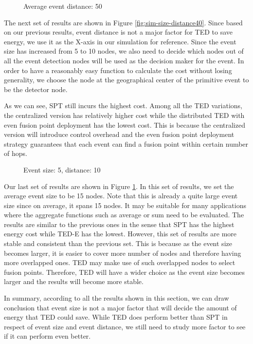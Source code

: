 \begin{figure}
\centering
{}
\caption{Average event distance: 50}
\label{fig:sim-size-distance50}
\end{figure}

The next set of results are shown in Figure \ref{fig:sim-size-distance40}. Since based on our previous results, event distance is not a major factor for TED to save energy, we use it as the X-axis in our simulation for reference. Since the event size has increased from 5 to 10 nodes, we also need to decide which nodes out of all the event detection nodes will be used as the decision maker for the event. In order to have a reasonably easy function to calculate the cost without losing generality, we choose the node at the geographical center of the primitive event to be the detector node.

As we can see, SPT still incurs the highest cost. Among all the TED variations, the centralized version has relatively higher cost while the distributed TED with even fusion point deployment has the lowest cost. This is because the centralized version will introduce control overhead and the even fusion point deployment strategy guarantees that each event can find a fusion point within certain number of hops.

\begin{figure}
\centering
{}
\caption{Event size: 5, distance: 10}
\label{fig:sim-prob-size5-dist10}
\end{figure}

Our last set of results are shown in Figure \ref{fig:sim-size-distance50}. In this set of results, we set the average event size to be 15 nodes. Note that this is already a quite large event size since on average, it spans 15 nodes. It may be suitable for many applications where the aggregate functions such as average or sum need to be evaluated. The results are similar to the previous ones in the sense that SPT has the highest energy cost while TED-E has the lowest. However, this set of results are more stable and consistent than the previous set. This is because as the event size becomes larger, it is easier to cover more number of nodes and therefore having more overlapped ones. TED may make use of such overlapped nodes to select fusion points. Therefore, TED will have a wider choice as the event size becomes larger and the results will become more stable.

In summary, according to all the results shown in this section, we can draw conclusion that event size is not a major factor that will decide the amount of energy that TED could save. While TED does perform better than SPT in respect of event size and event distance, we still need to study more factor to see if it can perform even better.

